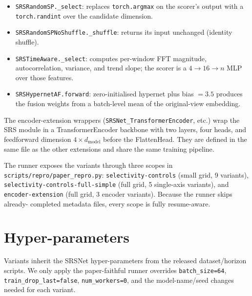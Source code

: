 \begin{itemize}
  \item \texttt{SRSRandomSP.\_select}: replaces
    \texttt{torch.argmax} on the scorer's output with a
    \texttt{torch.randint} over the candidate dimension.
  \item \texttt{SRSRandomSPNoShuffle.\_shuffle}: returns its
    input unchanged (identity shuffle).
  \item \texttt{SRSTimeAware.\_select}: computes per-window
    FFT magnitude, autocorrelation, variance, and trend slope;
    the scorer is a $4{\to}16{\to}n$ MLP over those features.
  \item \texttt{SRSHypernetAF.forward}: zero-initialised
    hypernet plus bias $=3.5$ produces the fusion weights from
    a batch-level mean of the original-view embedding.
\end{itemize}

The encoder-extension wrappers
(\texttt{SRSNet\_TransformerEncoder}, etc.) wrap the SRS
module in a TransformerEncoder backbone with two layers, four
heads, and feedforward dimension $4 \times d_\text{model}$
before the FlattenHead. They are defined in the same file as
the other extensions and share the same training pipeline.

The runner exposes the variants through three scopes in
\verb|scripts/repro/paper_repro.py|:
\texttt{selectivity-controls} (small grid, 9 variants),
\texttt{selectivity-controls-full-simple} (full grid, 5
single-axis variants), and \texttt{encoder-extension} (full
grid, 3 encoder variants). Because the runner skips already-
completed metadata files, every scope is fully resume-aware.

\section{Hyper-parameters}
\label{app:hyperparams}
Variants inherit the SRSNet hyper-parameters from the released dataset/horizon scripts. We only apply the
paper-faithful runner overrides \texttt{batch\_size=64}, \texttt{train\_drop\_last=false}, 
\texttt{num\_workers=0}, 
and the model-name/seed changes needed for each variant.
